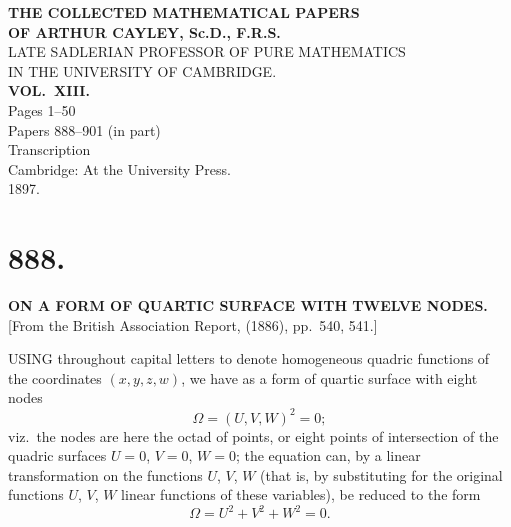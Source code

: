 \documentclass[11pt,a4paper]{article}
\begin{document}
\begin{titlepage}
\centering
\vspace*{2cm}
{\LARGE\bfseries THE COLLECTED MATHEMATICAL PAPERS\\[0.5em] OF ARTHUR CAYLEY, Sc.D., F.R.S.\\[1em]}
{\Large LATE SADLERIAN PROFESSOR OF PURE MATHEMATICS\\ IN THE UNIVERSITY OF CAMBRIDGE.\\[2em]}
{\LARGE\bfseries VOL.\ XIII.\\[2em]}
{\large Pages 1--50\\[0.5em] Papers 888--901 (in part)\\[2em]}
{\large Transcription\\[3em]}
\vfill
{\large Cambridge: At the University Press.\\ 1897.\\[1em]}
\end{titlepage}

\thispagestyle{empty}
\clearpage
\setcounter{page}{1}


\section*{888.}
\begin{center}
{\large\bfseries ON A FORM OF QUARTIC SURFACE WITH TWELVE NODES.}\\[0.5em]
\small [From the British Association Report, (1886), pp.\ 540, 541.]
\end{center}

USING throughout capital letters to denote homogeneous quadric functions of the coordinates $(x, y, z, w)$, we have as a form of quartic surface with eight nodes
\[
\Omega = (U, V, W)^2 = 0;
\]
viz.\ the nodes are here the octad of points, or eight points of intersection of the quadric surfaces $U=0$, $V=0$, $W=0$; the equation can, by a linear transformation on the functions $U$, $V$, $W$ (that is, by substituting for the original functions $U$, $V$, $W$ linear functions of these variables), be reduced to the form
\[
\Omega = U^2 + V^2 + W^2 = 0.
\]
\end{document}
